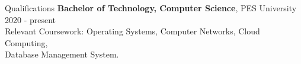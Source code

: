 \documentclass{resume} %
\begin{document}





\begin{rSection}{Qualifications}
\vspace{0.25cm}
{\bf Bachelor of Technology, Computer Science}, PES University \hfill {2020 - present}\\
Relevant Coursework: Operating Systems, Computer Networks, Cloud Computing,\\ Database Management System.



\end{rSection}
\end{document}
